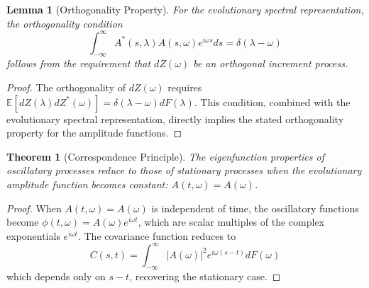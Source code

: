 \documentclass{article}
\newtheorem{theorem}{Theorem}
\newtheorem{lemma}{Lemma}
\begin{document}
\begin{lemma}[Orthogonality Property]
For the evolutionary spectral representation, the orthogonality condition
\begin{equation}
\int_{-\infty}^{\infty} A^*(s,\lambda)A(s,\omega)e^{i\omega s} ds = \delta(\lambda - \omega)
\end{equation}
follows from the requirement that $dZ(\omega)$ be an orthogonal increment process.
\end{lemma}

\begin{proof}
The orthogonality of $dZ(\omega)$ requires $\mathbb{E}[dZ(\lambda)dZ^*(\omega)] = \delta(\lambda - \omega)dF(\lambda)$. This condition, combined with the evolutionary spectral representation, directly implies the stated orthogonality property for the amplitude functions.
\end{proof}

\begin{theorem}[Correspondence Principle]
The eigenfunction properties of oscillatory processes reduce to those of stationary processes when the evolutionary amplitude function becomes constant: $A(t,\omega) = A(\omega)$.
\end{theorem}

\begin{proof}
When $A(t,\omega) = A(\omega)$ is independent of time, the oscillatory functions become $\phi(t,\omega) = A(\omega)e^{i\omega t}$, which are scalar multiples of the complex exponentials $e^{i\omega t}$. The covariance function reduces to
\begin{equation}
C(s,t) = \int_{-\infty}^{\infty} |A(\omega)|^2 e^{i\omega(s-t)} dF(\omega)
\end{equation}
which depends only on $s-t$, recovering the stationary case.
\end{proof}
\end{document}
